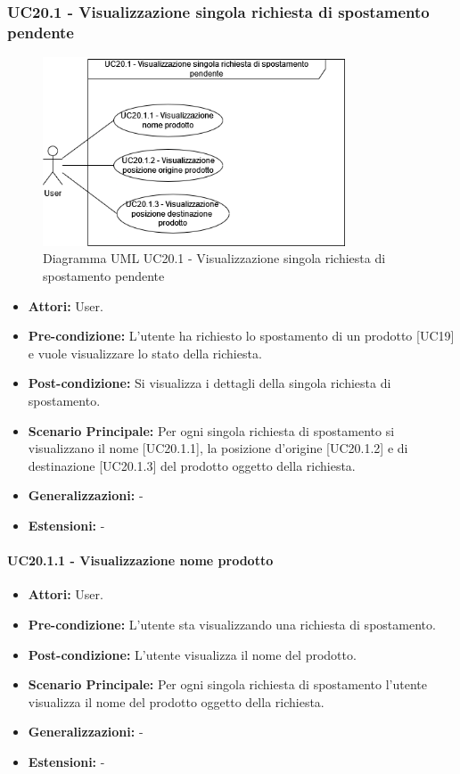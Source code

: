 \subsubsection{UC20.1 - Visualizzazione singola richiesta di spostamento pendente}
\begin{figure}[H]
  \centering
  \includegraphics[width=0.8\textwidth]{UC_diagrams_11-20/UC20.1.drawio.png}
   \caption{Diagramma UML UC20.1 - Visualizzazione singola richiesta di spostamento pendente}
\end{figure}
\begin{itemize}
    \item \textbf{Attori:} User.
    \item \textbf{Pre-condizione:}  L'utente ha richiesto lo spostamento di un prodotto [UC19] e vuole visualizzare lo stato della richiesta.
    \item \textbf{Post-condizione:} Si visualizza i dettagli della singola richiesta di spostamento.
    \item \textbf{Scenario Principale:} Per ogni singola richiesta di spostamento si visualizzano il nome [UC20.1.1], la posizione d'origine [UC20.1.2] e di destinazione [UC20.1.3] del prodotto oggetto della richiesta.
    \item \textbf{Generalizzazioni:} -
    \item \textbf{Estensioni:} -
\end{itemize}


\paragraph{UC20.1.1 - Visualizzazione nome prodotto}
\begin{itemize}
    \item \textbf{Attori:} User.
    \item \textbf{Pre-condizione:}  L'utente sta visualizzando una richiesta di spostamento.
    \item \textbf{Post-condizione:} L'utente visualizza il nome del prodotto.
    \item \textbf{Scenario Principale:} Per ogni singola richiesta di spostamento l'utente visualizza il nome del prodotto oggetto della richiesta.
    \item \textbf{Generalizzazioni:} -
    \item \textbf{Estensioni:} -
\end{itemize}


